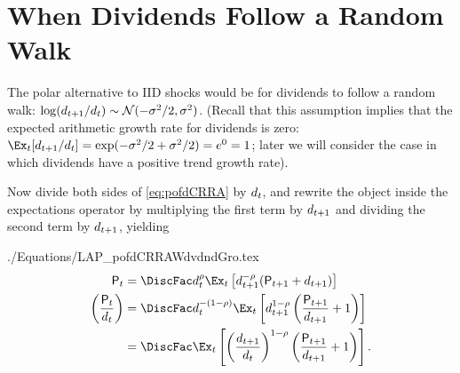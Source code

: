 \documentclass{\handout}
\begin{document}
\hypertarget{when-dividends-follow-a-random-walk}{}
\section{When Dividends Follow a Random Walk}

The polar alternative to IID shocks would be for dividends to follow a random walk: $\log (d_{t+1}/d_{t}) \sim \mathcal{N}(-\sigma^{2}/2,\sigma^{2})$.  (Recall that this assumption implies that the expected arithmetic growth rate for dividends is zero: $\Ex_{t}[\dvdnd_{t+1}/\dvdnd_{t}]=\exp(-\riskyvar/2+\riskyvar/2)=e^{0}=1$; later we will consider the case in which dividends have a positive trend growth rate).

Now divide both sides of \eqref{eq:pofdCRRA} by $d_{t}$, and rewrite the object inside the expectations operator by multiplying the first term by $d_{t+1}$ and dividing the second term by $d_{t+1}$, yielding
\begin{verbatimwrite}{./Equations/LAP_pofdCRRAWdvdndGro.tex}
\begin{equation}\begin{gathered}\begin{aligned}
 \Price_{t} & =  \DiscFac \dvdnd_{t}^{\CRRA} \Ex_{t}\left[\dvdnd_{t+1}^{-\CRRA}(\Price_{t+1}+\dvdnd_{t+1})\right] \label{eq:pofdCRRAWdvdndGro}
\\ \left(\frac{\Price_{t}}{\dvdnd_{t}}\right) & =  \DiscFac \dvdnd_{t}^{-(1-\CRRA)} \Ex_{t}\left[\dvdnd_{t+1}^{1-\CRRA}\left(\frac{\Price_{t+1}}{\dvdnd_{t+1}}+1\right)\right] 
\\ & =   \DiscFac  \Ex_{t}\left[\left(\frac{\dvdnd_{t+1}}{\dvdnd_{t}}\right)^{1-\CRRA}\left(\frac{\Price_{t+1}}{\dvdnd_{t+1}}+1\right)\right]
.
\end{aligned}\end{gathered}\end{equation}
\end{verbatimwrite}

\end{document}
